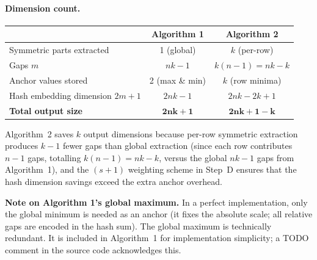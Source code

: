 \paragraph{Dimension count.}
\begin{center}
\renewcommand{\arraystretch}{1.3}
\begin{tabular}{lcc}
  \toprule
  & \textbf{\textcolor{alg1col}{Algorithm 1}} & \textbf{\textcolor{alg2col}{Algorithm 2}} \\
  \midrule
  Symmetric parts extracted & 1 (global) & $k$ (per-row) \\
  Gaps $m$ & $nk-1$ & $k(n-1)=nk-k$ \\
  Anchor values stored & 2 (max \& min) & $k$ (row minima) \\
  Hash embedding dimension $2m+1$ & $2nk-1$ & $2nk-2k+1$ \\
  \textbf{Total output size} & $\mathbf{2nk+1}$ & $\mathbf{2nk+1-k}$ \\
  \bottomrule
\end{tabular}
\end{center}

Algorithm~2 saves $k$ output dimensions because per-row symmetric extraction
produces $k-1$ fewer gaps than global extraction (since each row contributes
$n-1$ gaps, totalling $k(n-1) = nk-k$, versus the global $nk-1$ gaps from
Algorithm~1), and the $(s+1)$ weighting scheme in Step~D ensures that the
hash dimension savings exceed the extra anchor overhead.

\begin{tcolorbox}[notebox]
\textbf{Note on Algorithm 1's global maximum.}  In a perfect implementation,
only the global minimum is needed as an anchor (it fixes the absolute scale;
all relative gaps are encoded in the hash sum).  The global maximum is
technically redundant.  It is included in Algorithm~1 for implementation
simplicity; a TODO comment in the source code acknowledges this.
\end{tcolorbox}

